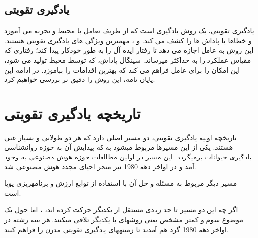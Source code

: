 \subsection{یادگیری تقویتی}
یادگیری تقویتی، یک روش یادگیری است که از طریف تعامل با محیط و تجربه می \nf آموزد و خطاها یا پاداش ها را کشف می کند.  و ، مهمترین ویژگی  های یادگیری تقویتی هستند. این روش به عامل اجازه می دهد تا رفتار ایده آل را به طور خودکار پیدا کند؛ رفتاری که مقیاس عملکرد را به حداکثر می\nf رساند. سینگال پاداش،  که توسط محیط تولید می شود، این امکان را برای عامل فراهم می \nf کند که بهترین اقدامات را بباموزد. در ادامه این پایان نامه، این روش را دقیق تر بررسی خواهیم کرد.


\section{تاریخچه یادگیری تقویتی}
تاریخچه اولیه یادگیری تقویتی، دو مسیر اصلی دارد که هر دو طولانی و بسیار غنی هستند. یکی از این مسیرها مربوط می\nf شود به  که پیدایش آن به حوزه روانشناسی یادگیری حیوانات برمی\nf گردد. این مسیر در اولین مطالعات حوزه هوش مصنوعی به وجود آمد و در اواخر دهه 1980 نیز منجر احیای مجدد هوش مصنوعی شد.

مسیر دیگر مربوط به مسئله  و حل آن با استفاده از توابع ارزش و برنامه\nf ریزی پویا است.

 اگر چه این دو مسیر تا حد زیادی مستقل از یکدیگر حرکت کرده اند،  ، اما حول یک موضوع سوم و کمتر مشخص یعنی روش\nf های   با یکدیگر تلاقی می\nf کنند. هر سه رشته در اواخر دهه 1980 گرد هم آمدند تا زمینه\nf های یادگیری تقویتی مدرن را فراهم کنند.




